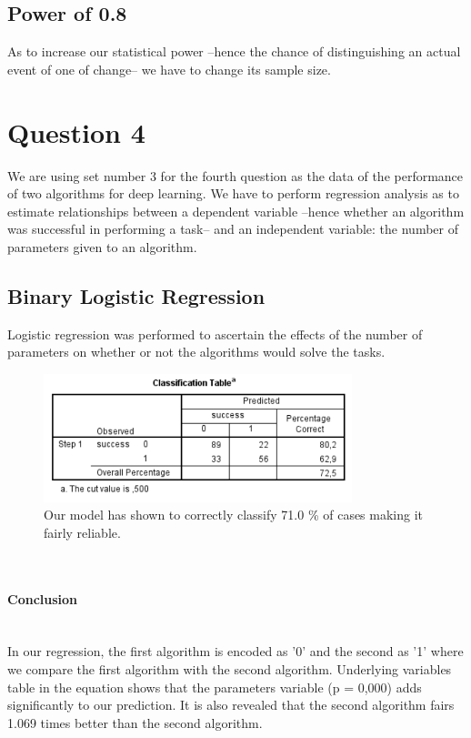 \documentclass[14]{article}
\begin{document}
\subsection{Power of 0.8}
As to increase our statistical power --hence the chance of distinguishing an actual event of one of change-- we have to change its sample size.

\section{Question 4}
We are using set number 3 for the fourth question as the data of the performance of two algorithms for deep learning. We have to perform regression analysis as to estimate relationships between a dependent variable --hence whether an algorithm was successful in performing a task-- and an independent variable: the number of parameters given to an algorithm.

\subsection{Binary Logistic Regression}
Logistic regression was performed to ascertain the effects of the number of parameters on whether or not the algorithms would solve the tasks. 

\begin{figure}[!htb]
	\includegraphics[width=0.8\textwidth]{img/question4/question4_classification.PNG}
	\captionsetup{width=0.8\textwidth}
	\centering 
	\caption{Our model has shown to correctly classify 71.0 \% of cases making it fairly reliable. }
\end{figure}\mbox{}\\

\newpage
\paragraph{Conclusion}\mbox{}\\
In our regression, the first algorithm is encoded as '0' and the second as '1' where we compare the first algorithm with the second algorithm. Underlying variables table in the equation shows that the parameters variable (p = 0,000) adds significantly to our prediction. It is also revealed that the second algorithm fairs 1.069 times better than the second algorithm.
\end{document}
